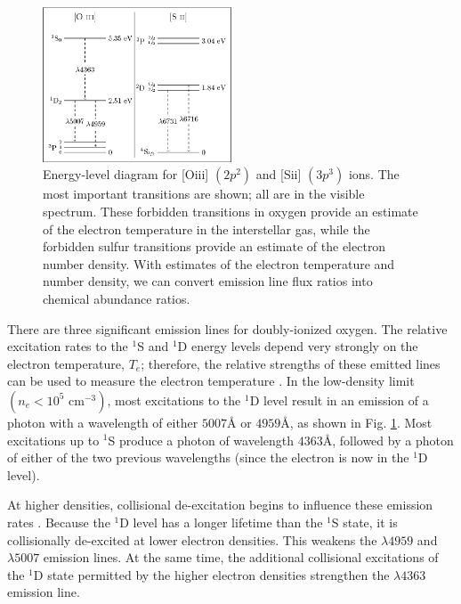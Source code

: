 \begin{figure}
	\centering
    \includegraphics[width=0.5\textwidth]{Images/Paper1/energy_level_diagram-figure0}
	\caption[{[] and [] energy-level diagram}]{Energy-level 
	diagram for [O{\sc iii}] $(2p^2)$ and [S{\sc ii}] $(3p^3)$ ions.  The most 
	important transitions are shown; all are in the visible spectrum.  These 
	forbidden transitions in oxygen provide an estimate of the electron temperature 
	in the interstellar gas, while the forbidden sulfur transitions provide an 
	estimate of the electron number density.  With estimates of the electron 
	temperature and number density, we can convert emission line flux ratios into 
	chemical abundance ratios.}
	\label{fig:transitions_P1}
\end{figure}

There are three significant emission lines for doubly-ionized oxygen.  The 
relative excitation rates to the $^1$S and $^1$D energy levels depend very 
strongly on the electron temperature, $T_e$; therefore, the relative strengths 
of these emitted lines can be used to measure the electron temperature 
\citep{Osterbrock89}.  In the low-density limit $(n_e < 10^5 \text{ cm}^{-3})$, 
most excitations to the $^1$D level result in an emission of a photon with a 
wavelength of either $5007\text{\AA}$ or $4959\text{\AA}$, as shown in Fig. 
\ref{fig:transitions_P1}.  Most excitations up to $^1$S produce a photon of 
wavelength $4363\text{\AA}$, followed by a photon of either of the two previous 
wavelengths (since the electron is now in the $^1$D level).

At higher densities, collisional de-excitation begins to influence these 
emission rates \citep{Osterbrock89}.  Because the $^1$D level has a longer 
lifetime than the $^1$S state, it is collisionally de-excited at lower electron 
densities.  This weakens the $\lambda 4959$ and $\lambda 5007$ emission lines.  
At the same time, the additional collisional excitations of the $^1$D state 
permitted by the higher electron densities strengthen the $\lambda 4363$ 
emission line.

